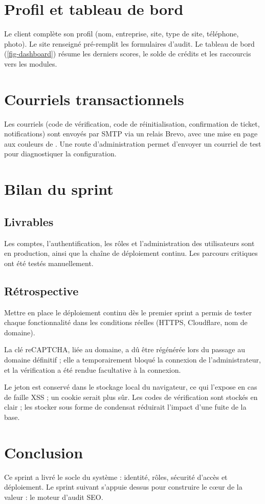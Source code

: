 \section{Profil et tableau de bord}
Le client complète son profil (nom, entreprise, site, type de site, téléphone, photo). Le site renseigné pré-remplit les formulaires d'audit. Le tableau de bord (\cref{fig-dashboard}) résume les derniers scores, le solde de crédits et les raccourcis vers les modules.


\section{Courriels transactionnels}
Les courriels (code de vérification, code de réinitialisation, confirmation de ticket, notifications) sont envoyés par SMTP via un relais Brevo, avec une mise en page aux couleurs de \xapp. Une route d'administration permet d'envoyer un courriel de test pour diagnostiquer la configuration.

\section{Bilan du sprint}
\subsection{Livrables}
Les comptes, l'authentification, les rôles et l'administration des utilisateurs sont en production, ainsi que la chaîne de déploiement continu. Les parcours critiques ont été testés manuellement. 

\subsection{Rétrospective}
\begin{description}[leftmargin=1.2em,style=nextline]
  \item[Ce qui a bien fonctionné.] Mettre en place le déploiement continu dès le premier sprint a permis de tester chaque fonctionnalité dans les conditions réelles (HTTPS, Cloudflare, nom de domaine).
  \item[Ce qui a posé problème.] La clé reCAPTCHA, liée au domaine, a dû être régénérée lors du passage au domaine définitif ; elle a temporairement bloqué la connexion de l'administrateur, et la vérification a été rendue facultative à la connexion. 
  \item[À améliorer.] Le jeton est conservé dans le stockage local du navigateur, ce qui l'expose en cas de faille XSS ; un cookie  serait plus sûr. Les codes de vérification sont stockés en clair ; les stocker sous forme de condensat réduirait l'impact d'une fuite de la base.
\end{description}

\section{Conclusion}
Ce sprint a livré le socle du système : identité, rôles, sécurité d'accès et déploiement. Le sprint suivant s'appuie dessus pour construire le cœur de la valeur : le moteur d'audit SEO.
